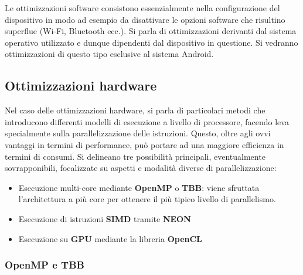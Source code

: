 Le ottimizzazioni software consistono essenzialmente nella configurazione del dispositivo in modo ad esempio
da disattivare le opzioni software che risultino superflue (Wi-Fi, Bluetooth ecc.). Si parla di ottimizzazioni derivanti dal
sistema operativo utilizzato e dunque dipendenti dal dispositivo in questione. Si vedranno ottimizzazioni di questo tipo
esclusive al sistema Android.

\subsection{Ottimizzazioni hardware}

Nel caso delle ottimizzazioni hardware, si parla di particolari metodi che introducono differenti modelli di esecuzione
a livello di processore, facendo leva specialmente sulla parallelizzazione delle istruzioni. Questo, oltre agli ovvi vantaggi
in termini di performance, può portare ad una maggiore efficienza in termini di consumi.
Si delineano tre possibilità principali, eventualmente sovrapponibili, focalizzate su aspetti e modalità diverse di 
parallelizzazione:
\begin{itemize}
    \item Esecuzione multi-core mediante \textbf{OpenMP} o \textbf{TBB}: viene sfruttata l'architettura a più core per
    ottenere il più tipico livello di parallelismo. 
    \item Esecuzione di istruzioni \textbf{SIMD} tramite \textbf{NEON}
    \item Esecuzione su \textbf{GPU} mediante la libreria \textbf{OpenCL}
\end{itemize}

\subsubsection{OpenMP e TBB}




\clearpage{\pagestyle{empty}\cleardoublepage}